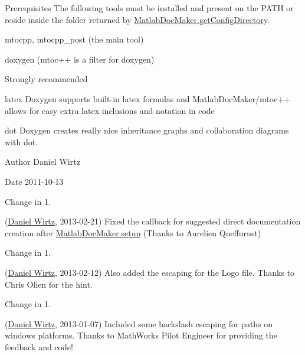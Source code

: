 \begin{DoxyParagraph}{Prerequisites}
The following tools must be installed and present on the P\+A\+T\+H or reside inside the folder returned by \hyperlink{class_matlab_doc_maker_a11a2a8ec616df969a911b325e39b0b4f}{Matlab\+Doc\+Maker.\+get\+Config\+Directory}.
\begin{DoxyItemize}
\item {\ttfamily mtocpp}, {\ttfamily mtocpp\+\_\+post} (the main tool)
\item {\ttfamily doxygen} (mtoc++ is a filter for doxygen)
\end{DoxyItemize}
\end{DoxyParagraph}
\begin{DoxyParagraph}{Strongly recommended}

\begin{DoxyItemize}
\item {\ttfamily latex} Doxygen supports built-\/in latex formulas and Matlab\+Doc\+Maker/mtoc++ allows for easy extra latex inclusions and notation in code
\item {\ttfamily dot} Doxygen creates really nice inheritance graphs and collaboration diagrams with dot.
\end{DoxyItemize}
\end{DoxyParagraph}
\begin{DoxyAuthor}{Author}
Daniel Wirtz 
\end{DoxyAuthor}
\begin{DoxyDate}{Date}
2011-\/10-\/13
\end{DoxyDate}
\begin{DoxyRefDesc}{Change in 1.}
\item[\hyperlink{changelog1_5__changelog1_5000001}{Change in 1.\+5}](\hyperlink{developers_dw}{Daniel Wirtz}, 2013-\/02-\/21) Fixed the callback for suggested direct documentation creation after \hyperlink{class_matlab_doc_maker_a434c176c2421dd18a40003919b19f4f2}{Matlab\+Doc\+Maker.\+setup} (Thanks to Aurelien Queffurust)\end{DoxyRefDesc}


\begin{DoxyRefDesc}{Change in 1.}
\item[\hyperlink{changelog1_5__changelog1_5000002}{Change in 1.\+5}](\hyperlink{developers_dw}{Daniel Wirtz}, 2013-\/02-\/12) Also added the escaping for the Logo file. Thanks to Chris Olien for the hint.\end{DoxyRefDesc}


\begin{DoxyRefDesc}{Change in 1.}
\item[\hyperlink{changelog1_5__changelog1_5000003}{Change in 1.\+5}](\hyperlink{developers_dw}{Daniel Wirtz}, 2013-\/01-\/07) Included some backslash escaping for paths on windows platforms. Thanks to Math\+Works Pilot Engineer \textquotesingle{} for providing the feedback and code!\end{DoxyRefDesc}


